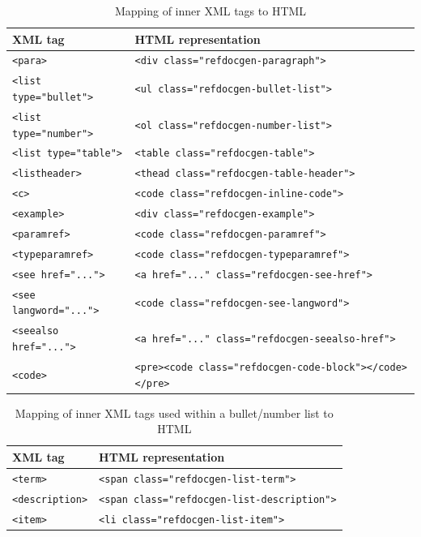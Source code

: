 \begin{table}[H]
\centering
\begin{tabular}{|p{5cm}|p{8cm}|}
\hline
\textbf{XML tag} & \textbf{HTML representation} \\ \hline
\texttt{<para>} & \texttt{<div class="refdocgen-paragraph">} \\ \hline
\texttt{<list type="bullet">} & \texttt{<ul class="refdocgen-bullet-list">} \\ \hline
\texttt{<list type="number">} & \texttt{<ol class="refdocgen-number-list">} \\ \hline
\texttt{<list type="table">} & \texttt{<table class="refdocgen-table">} \\ \hline
\texttt{<listheader>} & \texttt{<thead class="refdocgen-table-header">} \\ \hline
\texttt{<c>} & \texttt{<code class="refdocgen-inline-code">} \\ \hline
\texttt{<example>} & \texttt{<div class="refdocgen-example">} \\ \hline
\texttt{<paramref>} & \texttt{<code class="refdocgen-paramref">} \\ \hline
\texttt{<typeparamref>} & \texttt{<code class="refdocgen-typeparamref">} \\ \hline
\texttt{<see href="...">} & \texttt{<a href="..." class="refdocgen-see-href">} \\ \hline
\texttt{<see langword="...">} & \texttt{<code class="refdocgen-see-langword">} \\ \hline
\texttt{<seealso href="...">} & \texttt{<a href="..." class="refdocgen-seealso-href">} \\ \hline
\texttt{<code>} & \texttt{<pre><code class="refdocgen-code-block"></code></pre>} \\ \hline
\end{tabular}
\caption{Mapping of inner XML tags to HTML}
\label{table:default-xml-config}
\end{table}

\begin{table}[H]
\centering
\begin{tabular}{|p{5cm}|p{8cm}|}
\hline
\textbf{XML tag} & \textbf{HTML representation} \\ \hline
\texttt{<term>} & \texttt{<span class="refdocgen-list-term">} \\ \hline
\texttt{<description>} & \texttt{<span class="refdocgen-list-description">} \\ \hline
\texttt{<item>} & \texttt{<li class="refdocgen-list-item">} \\ \hline
\end{tabular}
\caption{Mapping of inner XML tags used within a bullet/number list to HTML}
\label{table:default-xml-config-inside-list}
\end{table}

